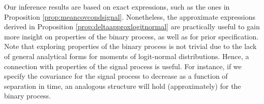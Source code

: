 


Our inference results are based on exact expressions, such as the ones in 
Proposition \ref{prop:meancovcondsignal}. Nonetheless, the approximate expressions 
derived in Proposition \ref{prop:deltaapproxlogitnormal} are practically useful to 
gain more insight on properties of the binary process, as well as for prior specification. 
Note that exploring properties of the binary process is not trivial due to the lack 
of general analytical forms for moments of logit-normal distributions. Hence, a 
connection with properties of the signal process is useful. For instance, if we 
specify the covariance for the signal process to decrease as a function of separation 
in time, %
an analogous structure will hold (approximately) for the binary process. 
%
%


%
%



